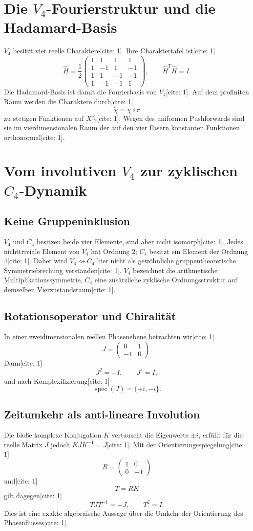 \documentclass[11pt,a4paper]{article}
\begin{document}
\section{Die $V_4$-Fourierstruktur und die Hadamard-Basis}
$V_4$ besitzt vier reelle Charaktere[cite: 1]. Ihre Charaktertafel ist[cite: 1]
\[
\widehat H=\frac12
\begin{pmatrix}
1&1&1&1\\
1&-1&1&-1\\
1&1&-1&-1\\
1&-1&-1&1
\end{pmatrix},\qquad \widehat H^T\widehat H=I.
\]
Die Hadamard-Basis ist damit die Fourierbasis von $V_4$[cite: 1]. Auf dem profiniten Raum werden die Charaktere durch[cite: 1]
\[
\widetilde\chi=\chi\circ\pi
\]
zu stetigen Funktionen auf $X_{12}^{\times}$[cite: 1]. Wegen des uniformen Pushforwards sind sie im vierdimensionalen Raum der auf den vier Fasern konstanten Funktionen orthonormal[cite: 1].

\section{Vom involutiven $V_4$ zur zyklischen $C_4$-Dynamik}
\subsection{Keine Gruppeninklusion}
$V_4$ und $C_4$ besitzen beide vier Elemente, sind aber nicht isomorph[cite: 1]. Jedes nichttriviale Element von $V_4$ hat Ordnung $2$; $C_4$ besitzt ein Element der Ordnung $4$[cite: 1]. Daher wird $V_4\rightsquigarrow C_4$ hier nicht als gewöhnliche gruppentheoretische Symmetriebrechung verstanden[cite: 1]. $V_4$ bezeichnet die arithmetische Multiplikationssymmetrie, $C_4$ eine zusätzliche zyklische Ordnungsstruktur auf demselben Vierzustandsraum[cite: 1].

\subsection{Rotationsoperator und Chiralität}
In einer zweidimensionalen reellen Phasenebene betrachten wir[cite: 1]
\[
J=\begin{pmatrix}0&1\\-1&0\end{pmatrix}.
\]
Dann[cite: 1]
\[
J^2=-I,\qquad J^4=I,
\]
und nach Komplexifizierung[cite: 1]
\[
\operatorname{spec}(J)=\{+i,-i\}.
\]

\subsection{Zeitumkehr als anti-lineare Involution}
Die bloße komplexe Konjugation $K$ vertauscht die Eigenwerte $\pm i$, erfüllt für die reelle Matrix $J$ jedoch $KJK^{-1}=J$[cite: 1]. Mit der Orientierungsspiegelung[cite: 1]
\[
R=\begin{pmatrix}1&0\\0&-1\end{pmatrix}
\]
und[cite: 1]
\[
T=RK
\]
gilt dagegen[cite: 1]
\[
\boxed{TJT^{-1}=-J,\qquad T^2=I.}
\]
Dies ist eine exakte algebraische Aussage über die Umkehr der Orientierung des Phasenflusses[cite: 1].
\end{document}
